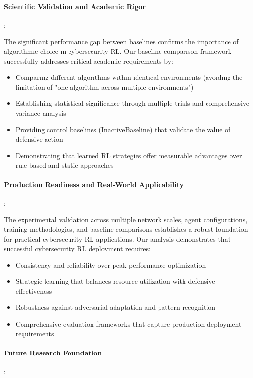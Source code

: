 \documentclass[12pt,oneside]{article}
\begin{document}
\paragraph{Scientific Validation and Academic Rigor}:

The significant performance gap between baselines confirms the importance of algorithmic choice in cybersecurity RL. Our baseline comparison framework successfully addresses critical academic requirements by:
\begin{itemize}
\item Comparing different algorithms within identical environments (avoiding the limitation of "one algorithm across multiple environments")
\item Establishing statistical significance through multiple trials and comprehensive variance analysis
\item Providing control baselines (InactiveBaseline) that validate the value of defensive action
\item Demonstrating that learned RL strategies offer measurable advantages over rule-based and static approaches
\end{itemize}

\paragraph{Production Readiness and Real-World Applicability}:

The experimental validation across multiple network scales, agent configurations, training methodologies, and baseline comparisons establishes a robust foundation for practical cybersecurity RL applications. Our analysis demonstrates that successful cybersecurity RL deployment requires:
\begin{itemize}
\item Consistency and reliability over peak performance optimization
\item Strategic learning that balances resource utilization with defensive effectiveness
\item Robustness against adversarial adaptation and pattern recognition
\item Comprehensive evaluation frameworks that capture production deployment requirements
\end{itemize}

\paragraph{Future Research Foundation}:
\end{document}
